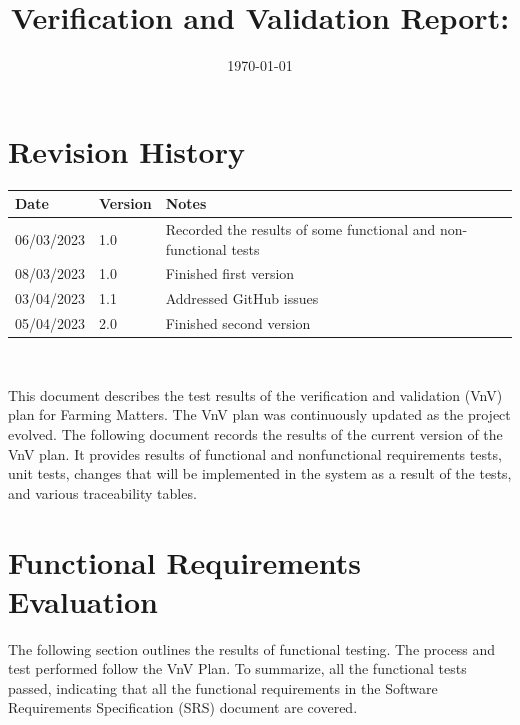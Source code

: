 \documentclass[12pt, titlepage]{article}
\begin{document}
\title{Verification and Validation Report: \progname} 
\author{\authname}
\date{\today}
	
\maketitle


\section{Revision History}

\begin{tabularx}{\textwidth}{p{3cm}p{2cm}X}
\toprule {\bf Date} & {\bf Version} & {\bf Notes}\\
\midrule
06/03/2023 & 1.0 & Recorded the results of some functional and non-functional tests\\
08/03/2023 & 1.0 & Finished first version\\
03/04/2023 & 1.1 & Addressed GitHub issues\\
05/04/2023 & 2.0 & Finished second version\\
\bottomrule
\end{tabularx}

~\newpage

\tableofcontents

\listoftables %

\listoffigures %

\newpage


This document describes the test results of the verification and validation (VnV) plan for Farming Matters. The VnV plan was continuously updated as the project evolved. The following document records the results of the current version of the VnV plan. It provides results of functional and nonfunctional requirements tests, unit tests, changes that will be implemented in the system as a result of the tests, and various traceability tables.


\section{Functional Requirements Evaluation}

The following section outlines the results of functional testing. The process and test performed follow the VnV Plan. To summarize, all the functional tests passed, indicating that all the functional requirements in the Software Requirements Specification (SRS) document are covered.
\end{document}

